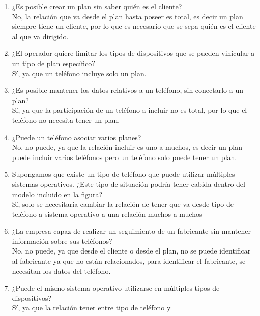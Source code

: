 \documentclass[a4paper, 12pt]{report}
\begin{document}
\begin{enumerate}
{\begin{enumerate}
{\begin{enumerate}
            cliente, por lo que no es necesario que tenga un plan.
            \item ¿Es posible crear un plan sin saber quién es el
            cliente?\\
            No, la relación que va desde el plan hasta poseer es total,
            es decir un plan siempre tiene un cliente, por lo que es
            necesario que se sepa quién es el cliente al que va
            dirigido.
            \item ¿El operador quiere limitar los tipos de dispositivos
            que se pueden vinicular a un tipo de plan específico?\\
            Sí, ya que un teléfono incluye solo un plan.
            \item ¿Es posible mantener los datos relativos a un
            teléfono, sin conectarlo a un plan?\\
            Sí, ya que la participación de un teléfono a incluir no es
            total, por lo que el teléfono no necesita tener un plan.
            \item ¿Puede un teléfono asociar varios planes?\\
            No, no puede, ya que la relación incluir es uno a muchos,
            es decir un plan puede incluir varios teléfonos pero un
            teléfono solo puede tener un plan.
            \item Supongamos que existe un tipo de teléfono que puede
            utilizar múltiples sistemas operativos. ¿Este tipo de
            situación podría tener cabida dentro del modelo incluido
            en la figura?\\
            Sí, solo se necesitaría cambiar la relación de tener que va
            desde tipo de teléfono a sistema operativo a una relación
            muchos a muchos
            \item ¿La empresa capaz de realizar un seguimiento de un
            fabricante sin mantener información sobre sus teléfonos?\\
            No, no puede, ya que desde el cliente o desde el plan,
            no se puede identificar al fabricante ya que no están
            relacionados, para identificar el fabricante, se necesitan
            los datos del teléfono.
            \item ¿Puede el mismo sistema operativo utilizarse en
            múltiples tipos de dispositivos?\\
            Sí, ya que la relación tener entre tipo de teléfono y

\end{enumerate}}
\end{enumerate}}
\end{enumerate}
\end{document}
